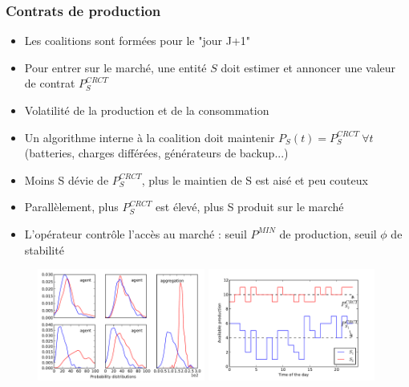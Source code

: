\documentclass[xcolor=dvipsnames]{beamer}
\begin{document}
%
%
\begin{frame}
	\frametitle{Contrats de production}
	
\begin{scriptsize}
\begin{itemize}
	\item Les coalitions sont formées pour le "jour J+1"
	\item Pour entrer sur le marché, une entité $ S $ doit estimer et annoncer une valeur de contrat $ P_{S}^{CRCT} $
	\item Volatilité de la production et de la consommation
	\item Un algorithme interne à la coalition doit maintenir $ P_{S}(t) = P_{S}^{CRCT}\ \forall t $ (batteries, charges différées, générateurs de backup...)
	\item Moins S dévie de $ P_{S}^{CRCT} $, plus le maintien de S est aisé et peu couteux 
	\item Parallèlement, plus $ P_{S}^{CRCT} $ est élevé, plus S produit sur le marché
	\item L'opérateur contrôle l'accès au marché : seuil $ P^{MIN} $ de production, seuil $ \phi $ de stabilité
\end{itemize}
\end{scriptsize}

\begin{figure}
	\includegraphics[width=5.5cm]{distri.pdf}
	\includegraphics[width=5.5cm]{production.pdf}
\end{figure}

\end{frame}
\end{document}
